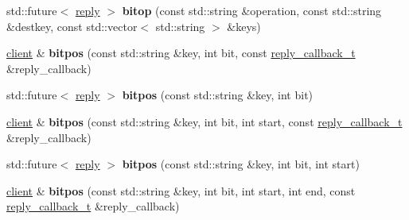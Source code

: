 \begin{DoxyCompactItemize}
\item 
\mbox{\label{classcpp__redis_1_1client_adbb955ee435dea43898ef811b31421b3}} 
std\+::future$<$ \mbox{\hyperlink{classcpp__redis_1_1reply}{reply}} $>$ {\bfseries bitop} (const std\+::string \&operation, const std\+::string \&destkey, const std\+::vector$<$ std\+::string $>$ \&keys)
\item 
\mbox{\label{classcpp__redis_1_1client_adf2ef5d020a8efbf6f6eb91cde63f262}} 
\mbox{\hyperlink{classcpp__redis_1_1client}{client}} \& {\bfseries bitpos} (const std\+::string \&key, int bit, const \mbox{\hyperlink{classcpp__redis_1_1client_af7a65eb21aa25230bfbb0b0203c4fc04}{reply\+\_\+callback\+\_\+t}} \&reply\+\_\+callback)
\item 
\mbox{\label{classcpp__redis_1_1client_a5be47a4b3f9a36c4fab420468d50256a}} 
std\+::future$<$ \mbox{\hyperlink{classcpp__redis_1_1reply}{reply}} $>$ {\bfseries bitpos} (const std\+::string \&key, int bit)
\item 
\mbox{\label{classcpp__redis_1_1client_a8f6b7958a3094c975c3ca053b263c523}} 
\mbox{\hyperlink{classcpp__redis_1_1client}{client}} \& {\bfseries bitpos} (const std\+::string \&key, int bit, int start, const \mbox{\hyperlink{classcpp__redis_1_1client_af7a65eb21aa25230bfbb0b0203c4fc04}{reply\+\_\+callback\+\_\+t}} \&reply\+\_\+callback)
\item 
\mbox{\label{classcpp__redis_1_1client_aa0ae004e45eb37ffed4d8c9f5ea35b4c}} 
std\+::future$<$ \mbox{\hyperlink{classcpp__redis_1_1reply}{reply}} $>$ {\bfseries bitpos} (const std\+::string \&key, int bit, int start)
\item 
\mbox{\label{classcpp__redis_1_1client_a3655449a666a9111d3dce7e61932ab1b}} 
\mbox{\hyperlink{classcpp__redis_1_1client}{client}} \& {\bfseries bitpos} (const std\+::string \&key, int bit, int start, int end, const \mbox{\hyperlink{classcpp__redis_1_1client_af7a65eb21aa25230bfbb0b0203c4fc04}{reply\+\_\+callback\+\_\+t}} \&reply\+\_\+callback)
\item 
\mbox{\label{classcpp__redis_1_1client_a43b5121105276ccae731bb6093c80e02}} 

\end{DoxyCompactItemize}
